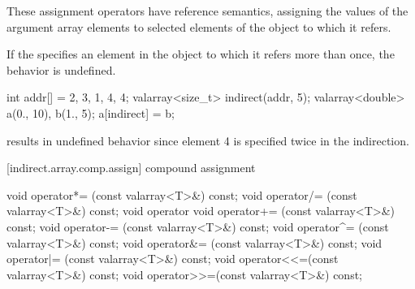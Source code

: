\begin{itemdescr}
\pnum
These assignment operators have reference semantics, assigning the values
of the argument array elements to selected elements of the
object to which it refers.

\pnum
If the
specifies an element in the
object to which it refers more than once, the behavior is undefined.
%

\pnum
\begin{example}
\begin{codeblock}
int addr[] = {2, 3, 1, 4, 4};
valarray<size_t> indirect(addr, 5);
valarray<double> a(0., 10), b(1., 5);
a[indirect] = b;
\end{codeblock}
results in undefined behavior since element 4 is specified twice in the
indirection.
\end{example}
\end{itemdescr}

[indirect.array.comp.assign]{ compound assignment}

%
%
%
%
%
%
%
%
%
%
%
%
%
%
\begin{itemdecl}
void operator*= (const valarray<T>&) const;
void operator/= (const valarray<T>&) const;
void operator%
void operator+= (const valarray<T>&) const;
void operator-= (const valarray<T>&) const;
void operator^= (const valarray<T>&) const;
void operator&= (const valarray<T>&) const;
void operator|= (const valarray<T>&) const;
void operator<<=(const valarray<T>&) const;
void operator>>=(const valarray<T>&) const;
\end{itemdecl}


